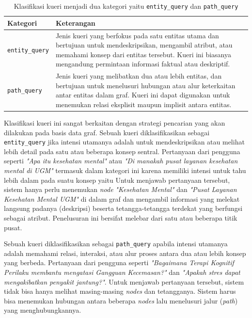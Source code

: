 \begin{table}[H]
	\centering
	\caption{Klasifikasi kueri menjadi dua kategori yaitu \texttt{entity\_query} dan \texttt{path\_query}}
	\label{tab:query-classification}
	\begin{tabular}{|l|p{8cm}|}
		\hline
		\textbf{Kategori}      & \textbf{Keterangan}                                               \\
		\hline
		\texttt{entity\_query} &
		Jenis kueri yang berfokus pada satu entitas utama dan bertujuan untuk mendeskripsikan, mengambil atribut, atau memahami konsep dari entitas tersebut.
		Kueri ini biasanya mengandung permintaan informasi faktual atau deskriptif.                \\
		\hline
		\texttt{path\_query}   &
		Jenis kueri yang melibatkan dua atau lebih entitas, dan bertujuan untuk menelusuri hubungan atau alur keterkaitan antar entitas dalam graf.
		Kueri ini dapat digunakan untuk menemukan relasi eksplisit maupun implisit antara entitas. \\
		\hline
	\end{tabular}
\end{table}

Klasifikasi kueri ini sangat berkaitan dengan strategi pencarian yang akan dilakukan pada basis data graf.
Sebuah kueri diklasifikasikan sebagai \texttt{entity\_query} jika intensi utamanya adalah untuk mendeskripsikan atau melihat lebih detail pada satu atau beberapa konsep sentral.
Pertanyaan dari pengguna seperti \textit{"Apa itu kesehatan mental"} atau \textit{"Di manakah pusat layanan kesehatan mental di UGM"} termasuk dalam kategori ini karena memiliki intensi untuk tahu lebih dalam pada suatu konsep yaitu
Untuk menjawab pertanyaan tersebut, sistem hanya perlu menemukan \textit{node} \textit{"Kesehatan Mental"} dan \textit{"Pusat Layanan Kesehatan Mental UGM"} di dalam graf dan mengambil informasi yang melekat langsung padanya (deskripsi) beserta tetangga-tetangga terdekat yang berfungsi sebagai atribut.
Penelusuran ini bersifat melebar dari satu atau beberapa titik pusat.

Sebuah kueri diklasifikasikan sebagai \texttt{path\_query} apabila intensi utamanya adalah memahami relasi, interaksi, atau alur proses antara dua atau lebih konsep yang berbeda.
Pertanyaan dari pengguna seperti \textit{"Bagaimana Terapi Kognitif Perilaku membantu mengatasi Gangguan Kecemasan?"} dan \textit{"Apakah stres dapat mengakibatkan penyakit jantung?"}.
Untuk menjawab pertanyaan tersebut, sistem tidak bisa hanya melihat masing-masing \textit{nodes} dan tetangganya.
Sistem harus bisa menemukan hubungan antara beberapa \textit{nodes} lalu menelusuri jalur (\textit{path}) yang menghubungkannya.

